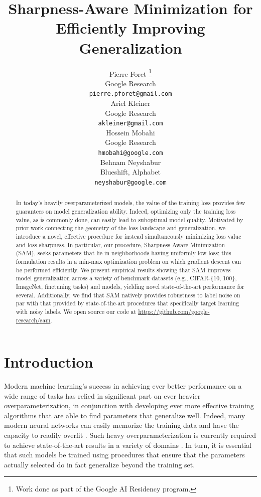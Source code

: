 \documentclass{article} %
\title{
Sharpness-Aware Minimization for Efficiently Improving Generalization
}
\author{%
  Pierre Foret \thanks{Work done as part of the Google AI Residency program.} \\
  Google Research \\
  \texttt{pierre.pforet@gmail.com} \\
  \And
  Ariel Kleiner \\
  Google Research \\
  \texttt{akleiner@gmail.com} \\
  \And
  Hossein Mobahi \\
  Google Research \\
  \texttt{hmobahi@google.com} \\
  \And
  Behnam Neyshabur \\
  Blueshift, Alphabet\\
  \texttt{neyshabur@google.com} \\
}
\begin{document}
\maketitle


\begin{abstract}
In today's heavily overparameterized models, the value of the training loss provides few guarantees on model generalization ability. Indeed, optimizing only the training loss value, as is commonly done, can easily lead to suboptimal model quality. Motivated by prior work connecting the geometry of the loss landscape and generalization, we introduce a novel, effective procedure for instead simultaneously minimizing loss value and loss sharpness.  In particular, our procedure, Sharpness-Aware Minimization (SAM), seeks parameters that lie in neighborhoods having uniformly low loss; this formulation results in a min-max optimization problem on which gradient descent can be performed efficiently. We present empirical results showing that SAM improves model generalization across a variety of benchmark datasets (e.g., CIFAR-\{10, 100\}, ImageNet, finetuning tasks) and models, yielding novel state-of-the-art performance for several.  Additionally, we find that SAM natively provides robustness to label noise on par with that provided by state-of-the-art procedures that specifically target learning with noisy labels. We open source our code at \url{https://github.com/google-research/sam}.
\end{abstract}

\section{Introduction}

Modern machine learning's success in achieving ever better performance on a wide range of tasks has relied in significant part on ever heavier overparameterization, in conjunction with developing ever more effective training algorithms that are able to find parameters that generalize well.  Indeed, many modern neural networks can easily memorize the training data and have the capacity to readily overfit \citep{rethinking_generalization}.  Such heavy overparameterization is currently required to achieve state-of-the-art results in a variety of domains \citep{efficientnet, bitm, gpipe}. In turn, it is essential that such models be trained using procedures that ensure that the parameters actually selected do in fact generalize beyond the training set.
\end{document}
